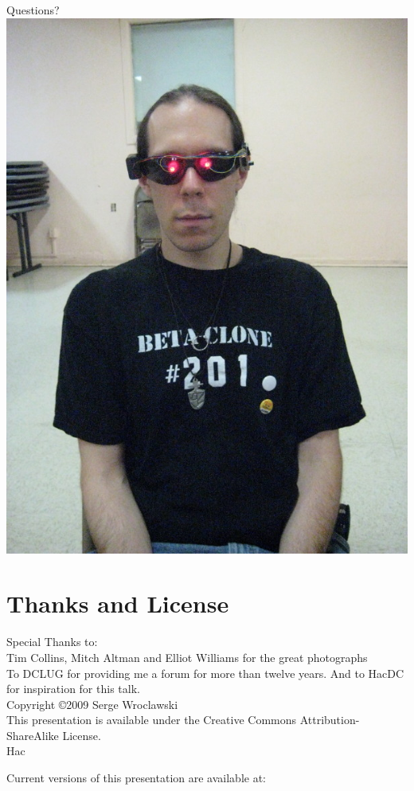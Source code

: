 \documentclass[notes]{beamer}
\begin{document}
\begin{frame}
  \begin{center}
    {\Large Questions?}\\
  \includegraphics[height=.9\textheight]{bryce-eyes.jpg}
  \end{center}
\end{frame}

\section{Thanks and License}

\begin{frame}
  \vfill
  Special Thanks to:\\
  Tim Collins, Mitch Altman and Elliot Williams for the great photographs
  \\
  To DCLUG for providing me a forum for more than twelve years.
  And to HacDC for inspiration for this talk.
  \\
  Copyright \copyright 2009 Serge Wroclawski
  \\
  This presentation is available under the Creative Commons
  Attribution-ShareAlike License.
  \\
  Hac
  
  Current versions of this presentation are available at:
\end{frame}
\end{document}
